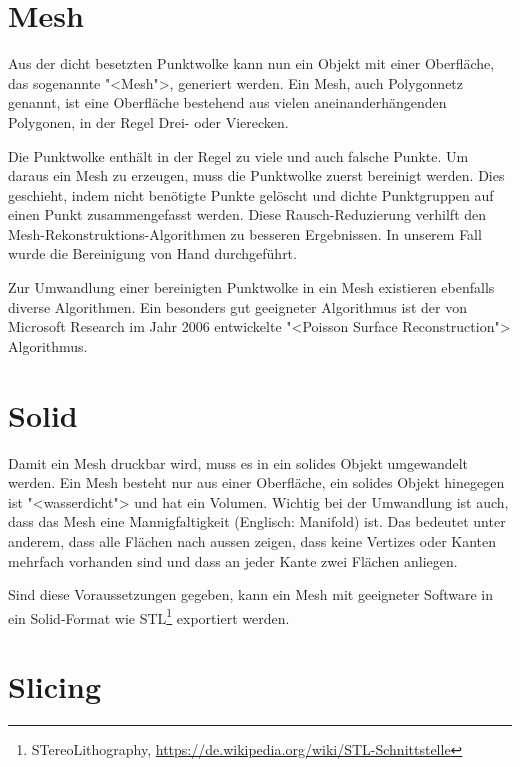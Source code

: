 \section{Mesh}

\label{photogrammetry:mesh}

Aus der dicht besetzten Punktwolke kann nun ein Objekt mit einer Oberfläche, das
sogenannte "<Mesh">, generiert werden. Ein Mesh, auch Polygonnetz genannt, ist
eine Oberfläche bestehend aus vielen aneinanderhängenden Polygonen, in der Regel
Drei- oder Vierecken.

Die Punktwolke enthält in der Regel zu viele und auch falsche Punkte. Um daraus
ein Mesh zu erzeugen, muss die Punktwolke zuerst bereinigt werden. Dies
geschieht, indem nicht benötigte Punkte gelöscht und dichte Punktgruppen auf
einen Punkt zusammengefasst werden. Diese Rausch-Reduzierung verhilft den
Mesh-Rekon\-struk\-tions-Algorithmen zu besseren Ergebnissen. In unserem Fall wurde
die Bereinigung von Hand durchgeführt.

Zur Umwandlung einer bereinigten Punktwolke in ein Mesh existieren ebenfalls
diverse Algorithmen. Ein besonders gut geeigneter Algorithmus ist der von
Microsoft Research im Jahr 2006 entwickelte "<Poisson Surface
Reconstruction">\cite{kazhdan:2006} Algorithmus.


\section{Solid}

Damit ein Mesh druckbar wird, muss es in ein solides Objekt umgewandelt werden.
Ein Mesh besteht nur aus einer Oberfläche, ein solides Objekt hinegegen ist
"<wasserdicht"> und hat ein Volumen. Wichtig bei der Umwandlung ist auch, dass
das Mesh eine Mannigfaltigkeit (Englisch: Manifold) ist. Das bedeutet unter
anderem, dass alle Flächen nach aussen zeigen, dass keine Vertizes oder Kanten
mehrfach vorhanden sind und dass an jeder Kante zwei Flächen anliegen.

Sind diese Voraussetzungen gegeben, kann ein Mesh mit geeigneter Software in
ein Solid-Format wie STL\footnote{STereoLithography,
	\url{https://de.wikipedia.org/wiki/STL-Schnittstelle}} exportiert werden.


\section{Slicing}

